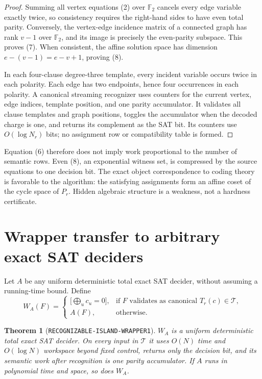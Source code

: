 \documentclass[11pt]{article}
\newtheorem{theorem}{Theorem}
\begin{document}
\begin{proof}
Summing all vertex equations (2) over $\mathbb F_2$ cancels every edge variable exactly twice, so consistency requires the right-hand sides to have even total parity.  Conversely, the vertex-edge incidence matrix of a connected graph has rank $v-1$ over $\mathbb F_2$, and its image is precisely the even-parity subspace.  This proves (7).  When consistent, the affine solution space has dimension $e-(v-1)=e-v+1$, proving (8).

In each four-clause degree-three template, every incident variable occurs twice in each polarity.  Each edge has two endpoints, hence four occurrences in each polarity.  A canonical streaming recognizer uses counters for the current vertex, edge indices, template position, and one parity accumulator.  It validates all clause templates and graph positions, toggles the accumulator when the decoded charge is one, and returns its complement as the SAT bit.  Its counters use $O(\log N_r)$ bits; no assignment row or compatibility table is formed.
\end{proof}

Equation (6) therefore does not imply work proportional to the number of semantic rows.  Even (8), an exponential witness set, is compressed by the source equations to one decision bit.  The exact object correspondence to coding theory is favorable to the algorithm: the satisfying assignments form an affine coset of the cycle space of $P_r$.  Hidden algebraic structure is a weakness, not a hardness certificate.

\section{Wrapper transfer to arbitrary exact SAT deciders}

Let $A$ be any uniform deterministic total exact SAT decider, without assuming a running-time bound.  Define
\[
 W_A(F)=
 \begin{cases}
 \bigl[\bigoplus_u c_u=0\bigr],&\text{if $F$ validates as canonical $T_r(c)\in\mathcal T$},\\
 A(F),&\text{otherwise}.
 \end{cases}
 \tag{9}
\]

\begin{theorem}[\texttt{RECOGNIZABLE-ISLAND-WRAPPER1}]
$W_A$ is a uniform deterministic total exact SAT decider.  On every input in $\mathcal T$ it uses $O(N)$ time and $O(\log N)$ workspace beyond fixed control, returns only the decision bit, and its semantic work after recognition is one parity accumulator.  If $A$ runs in polynomial time and space, so does $W_A$.
\end{theorem}
\end{document}
